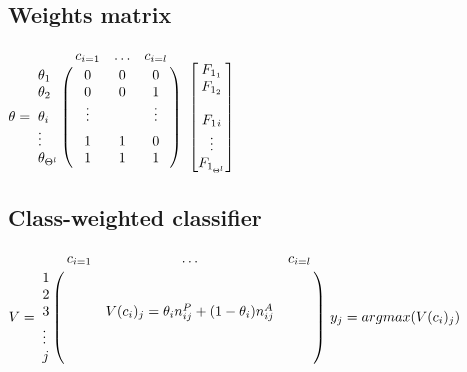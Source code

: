 \documentclass{article}
\let\bbordermatrix\bordermatrix
\begin{document}
\subsection*{Weights matrix}

$\theta = \bbordermatrix{~ & c_{i=1} & \ldots & c_{i=l} \cr
  \theta_1 &  0 & 0 & 0 \cr
  \theta_2 & 0 & 0 & 1 \cr
  \theta_i & \vdots & & \vdots \cr
  \vdots & 1 & 1 & 0 \cr
  \theta_{\Theta^l} & 1 & 1 & 1 } ~
\begin{bmatrix}
  F_{1_1} \\
  F_{1_2} \\
  ~ \\
  F_1{_i} \\
  \vdots \\
  F_{1_{\Theta^l}} \\
\end{bmatrix}
$

\subsection*{Class-weighted classifier}



$V = \bbordermatrix{~ & c_{i=1} & \ldots & c_{i=l} \cr
  1 &  &  &  \cr
  2 &  &  &  \cr
  3 &  & V(c_i)_j = \theta_i n_{ij}^{P} + (1 - \theta_i) n_{ij}^{A} & \cr
  \vdots &  &  &  \cr
  j &  & &  }
~ y_j = argmax(V(c_i)_j)$
\end{document}
